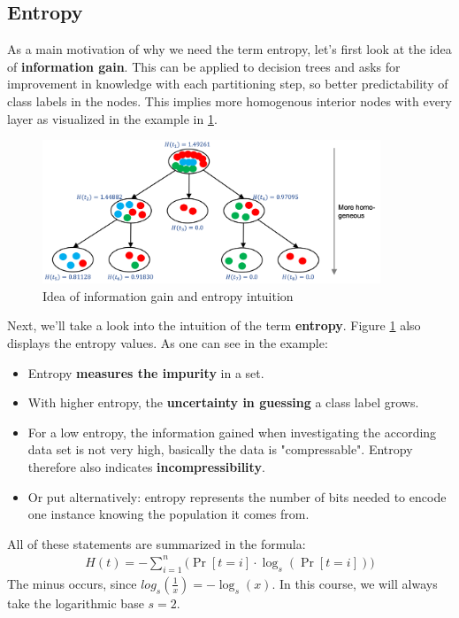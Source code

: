 \subsection{Entropy}

As a main motivation of why we need the term entropy, let's first look at the idea of \textbf{information gain}. This can be applied to decision trees and asks for improvement in knowledge with each partitioning step, so better predictability of class labels in the nodes. This implies more homogenous interior nodes with every layer as visualized in the example in \ref{fig:3_information_gain}.

\begin{figure}[h]
  \centering
  \includegraphics[width=0.9\textwidth]{assets/trees/entropy/entry_example.png}
  \caption{Idea of information gain and entropy intuition}
  \label{fig:3_information_gain}
\end{figure}

Next, we'll take a look into the intuition of the term \textbf{entropy}. Figure \ref{fig:3_information_gain} also displays the entropy values. As one can see in the example:
\begin{itemize}
  \item Entropy \textbf{measures the impurity} in a set.
  \item With higher entropy, the \textbf{uncertainty in guessing} a class label grows.
  \item For a low entropy, the information gained when investigating the according data set is not very high, basically the data is "compressable". Entropy therefore also indicates \textbf{incompressibility}.
  \item Or put alternatively: entropy represents the number of bits needed to encode one instance knowing the population it comes from.
\end{itemize}

All of these statements are summarized in the formula:
\begin{align*}
  H(t) = - \sum_{i=1}^{n} \big( \Pr[t=i] \cdot \log_s (\Pr[t=i]) \big)
\end{align*}
The minus occurs, since $log_s(\frac{1}{x})=-\log_s(x)$. In this course, we will always take the logarithmic base $s=2$.

